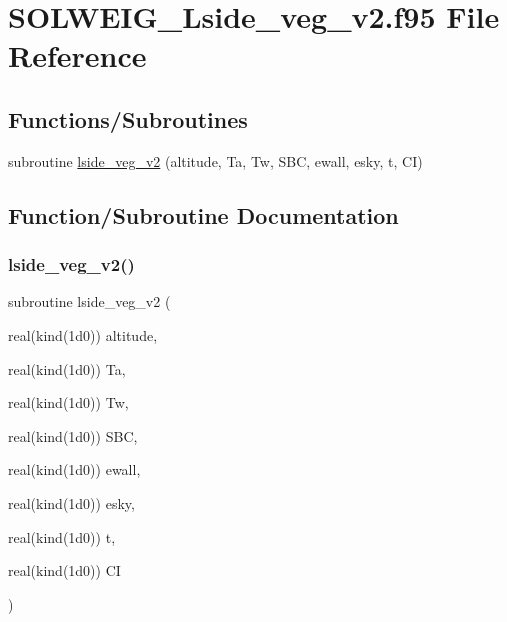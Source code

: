 \hypertarget{_s_o_l_w_e_i_g___lside__veg__v2_8f95}{}\section{S\+O\+L\+W\+E\+I\+G\+\_\+\+Lside\+\_\+veg\+\_\+v2.\+f95 File Reference}
\label{_s_o_l_w_e_i_g___lside__veg__v2_8f95}
\subsection*{Functions/\+Subroutines}
\begin{DoxyCompactItemize}
\item 
subroutine \hyperlink{_s_o_l_w_e_i_g___lside__veg__v2_8f95_a5ee1707001cdd556fc8bd619efaf7610}{lside\+\_\+veg\+\_\+v2} (altitude, Ta, Tw, S\+BC, ewall, esky, t, CI)
\end{DoxyCompactItemize}


\subsection{Function/\+Subroutine Documentation}
\mbox{\label{_s_o_l_w_e_i_g___lside__veg__v2_8f95_a5ee1707001cdd556fc8bd619efaf7610}} 
\subsubsection{\texorpdfstring{lside\+\_\+veg\+\_\+v2()}{lside\_veg\_v2()}}
{\footnotesize\ttfamily subroutine lside\+\_\+veg\+\_\+v2 (\begin{DoxyParamCaption}\item[{real(kind(1d0))}]{altitude,  }\item[{real(kind(1d0))}]{Ta,  }\item[{real(kind(1d0))}]{Tw,  }\item[{real(kind(1d0))}]{S\+BC,  }\item[{real(kind(1d0))}]{ewall,  }\item[{real(kind(1d0))}]{esky,  }\item[{real(kind(1d0))}]{t,  }\item[{real(kind(1d0))}]{CI }\end{DoxyParamCaption})}



